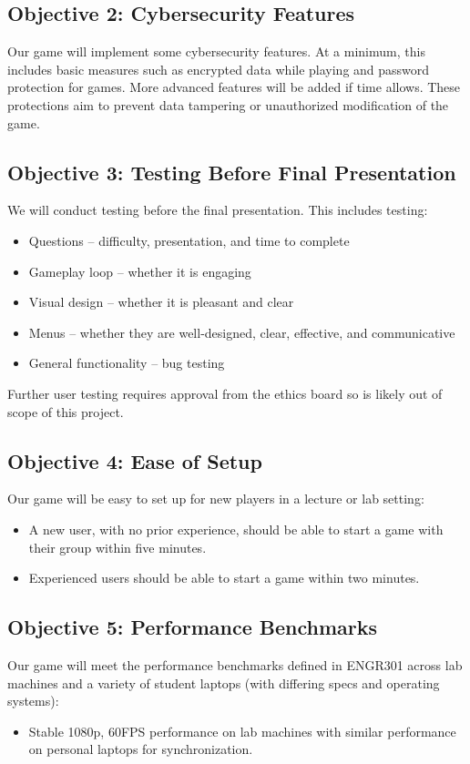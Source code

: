 \documentclass{article}
\begin{document}
\subsection*{Objective 2: Cybersecurity Features}
Our game will implement some cybersecurity features. At a minimum, this includes basic measures such as encrypted data while playing and password protection for games. More advanced features will be added if time allows. These protections aim to prevent data tampering or unauthorized modification of the game.

\subsection*{Objective 3: Testing Before Final Presentation}
We will conduct testing before the final presentation. This includes testing:
\begin{itemize}
    \item Questions – difficulty, presentation, and time to complete
    \item Gameplay loop – whether it is engaging
    \item Visual design – whether it is pleasant and clear
    \item Menus – whether they are well-designed, clear, effective, and communicative
    \item General functionality – bug testing
\end{itemize}
Further user testing requires approval from the ethics board so is likely out of scope of this project. 

\subsection*{Objective 4: Ease of Setup}
Our game will be easy to set up for new players in a lecture or lab setting:
\begin{itemize}
    \item A new user, with no prior experience, should be able to start a game with their group within five minutes.
    \item Experienced users should be able to start a game within two minutes.
\end{itemize}

\subsection*{Objective 5: Performance Benchmarks}
Our game will meet the performance benchmarks defined in ENGR301 across lab machines and a variety of student laptops (with differing specs and operating systems):
\begin{itemize}
    \item Stable 1080p, 60FPS performance on lab machines with similar performance on personal laptops for synchronization.
\end{itemize}
\end{document}
